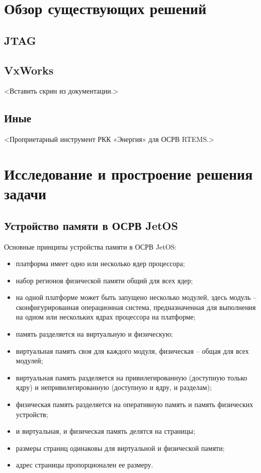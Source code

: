 \documentclass[oneside,senior,etd]{BYUPhys}
\begin{document}
\section{Обзор существующих решений}

\subsection{JTAG}

\subsection{VxWorks}
<Вставить скрин из документации.>

\subsection{Иные}
<Проприетарный инструмент РКК «Энергия» для ОСРВ RTEMS.>


\section{Исследование и простроение решения задачи}

\subsection{Устройство памяти в ОСРВ JetOS}

Основные принципы устройства памяти в ОСРВ JetOS:
\begin{itemize}
  \item платформа имеет одно или несколько ядер процессора;
  \item набор регионов физической памяти общий для всех ядер;
  \item на одной платформе может быть запущено несколько модулей,
  здесь модуль -- сконфигурированная операционная система, предназначенная для выполнения
  на одном или нескольких ядрах процессора на платформе;
  \item память разделяется на виртуальную и физическую;
  \item виртуальная память своя для каждого модуля, физическая -- общая для всех модулей;
  \item виртуальная память разделяется на привилегированную (доступную только ядру)
  и непривилегированную (доступную и ядру, и разделам);
  \item физическая память разделяется на оперативную память и память физических устройств;
  \item и виртуальная, и физическая память делятся на страницы;
  \item размеры страниц одинаковы для виртуальной и физической памяти;
  \item адрес страницы пропорционален ее размеру.
\end{itemize}
\end{document}
